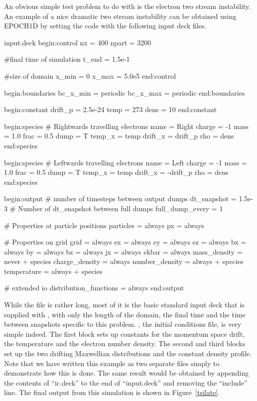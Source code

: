 An obvious simple test problem to do with {\EPOCH} is the electron two stream
instability. An example of a nice dramatic two stream instability can be
obtained using EPOCH1D by setting the code with the following input deck
files.
\begin{lboxverbatim}{input.deck}
begin:control
  nx = 400
  npart = 3200

  #final time of simulation
  t_end = 1.5e-1

  #size of domain
  x_min = 0
  x_max = 5.0e5
end:control


begin:boundaries
  bc_x_min = periodic
  bc_x_max = periodic
end:boundaries


begin:constant
  drift_p = 2.5e-24
  temp = 273
  dens = 10
end:constant


begin:species
  # Rightwards travelling electrons
  name = Right
  charge = -1
  mass = 1.0
  frac = 0.5
  dump = T
  temp_x = temp
  drift_x = drift_p
  rho = dens
end:species


begin:species
  # Leftwards travelling electrons
  name = Left
  charge = -1
  mass = 1.0
  frac = 0.5
  dump = T
  temp_x = temp
  drift_x = -drift_p
  rho = dens
end:species


begin:output
  # number of timesteps between output dumps
  dt_snapshot = 1.5e-3
  # Number of dt_snapshot between full dumps
  full_dump_every = 1

  # Properties at particle positions
  particles = always
  px = always

  # Properties on grid
  grid = always
  ex = always
  ey = always
  ez = always
  bx = always
  by = always
  bz = always
  jx = always
  ekbar = always
  mass_density = never + species
  charge_density = always
  number_density = always + species
  temperature = always + species

  # extended io
  distribution_functions = always
end:output
\end{lboxverbatim}


While the  file is rather long, most of it is the basic
standard input deck that is supplied with {\EPOCH}, with only the length of the
domain, the final time and the time between snapshots specific to this
problem. , the initial conditions file, is very simple
indeed. The first block sets up constants for the momentum space drift, the
temperature and the electron number density. The second and third blocks set up
the two drifting Maxwellian distributions and the constant density profile.
Note that we have written this example as two separate files simply
to demonstrate how this is done. The
same result would be obtained by appending the contents of ``ic.deck'' to
the end of ``input.deck'' and removing the ``include'' line.
The final output from this simulation is shown in Figure~\ref{tsilate}.

